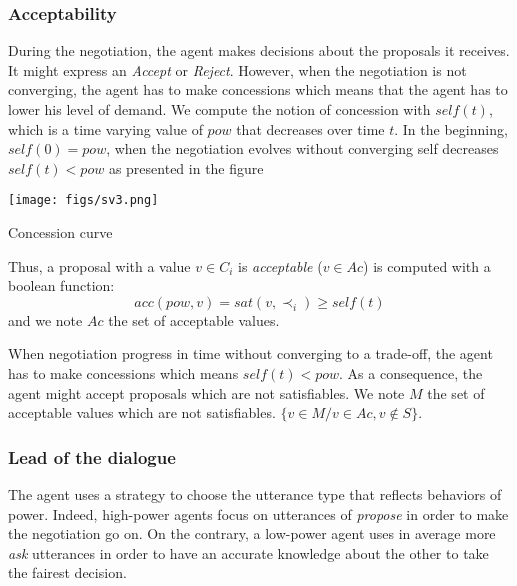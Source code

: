 \documentclass{llncs}
\begin{document}
		
	\subsubsection{Acceptability}
	 
	 During the negotiation, the agent makes decisions about the proposals it receives. It might express an \emph{Accept} or \emph{Reject}. However, when the negotiation is not converging, the agent has to make concessions which means that the agent has to lower his level of demand. 
	 We compute the notion of concession with $self(t)$, which is a time varying value of $pow$ that decreases over time $t$. In the beginning, $self(0) = pow$, when the negotiation evolves without converging self decreases $self(t) < pow$ as presented in the figure 
	 	\begin{floatingfigure}[r]{1.8in}
	 		\texttt{[image: figs/sv3.png]}
	 		\caption{\label{fig:conc}Concession curve}
	 	\end{floatingfigure} 
	 
	Thus, a proposal with a value $v \in C_i$ is \emph{acceptable} ($v \in Ac$) is computed with a boolean function:
			\begin{equation}
				acc(pow, v) = sat(v, \prec_i) \geq self(t)
			\end{equation}	
	and we note $Ac$ the set of acceptable values.

	When negotiation progress in time without converging to a trade-off, the agent has to make concessions which means $self(t) < pow$. As a consequence, the agent might accept proposals which are not satisfiables. We note $M$ the set of acceptable values which are not satisfiables.
	$\{v \in M / v \in Ac, v \notin S\}$.
	
%	
\subsubsection{Lead of the dialogue}
	The agent uses a strategy to choose the utterance type that reflects behaviors of power. Indeed, high-power agents focus on utterances of \emph{propose} in order to make the negotiation go on. On the contrary, a low-power agent uses in average more \emph{ask} utterances in order to have an accurate knowledge about the other to take the fairest decision.
	
\end{document}

